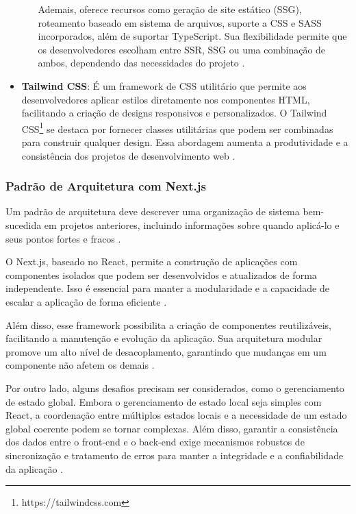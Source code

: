 \begin{itemize}
\begin{itemize}
        Ademais, oferece recursos como geração de site estático (SSG), roteamento baseado em sistema de arquivos, suporte a CSS e SASS incorporados, além de suportar TypeScript. Sua flexibilidade permite que os desenvolvedores escolham entre SSR, SSG ou uma combinação de ambos, dependendo das necessidades do projeto \cite{RenanNextjs2024}.
    \end{itemize}
    \item \textbf{Tailwind CSS}: É um framework de CSS utilitário que permite aos desenvolvedores aplicar estilos diretamente nos componentes HTML, facilitando a criação de designs responsivos e personalizados. O Tailwind CSS\footnote{https://tailwindcss.com} se destaca por fornecer classes utilitárias que podem ser combinadas para construir qualquer design. Essa abordagem aumenta a produtividade e a consistência dos projetos de desenvolvimento web \cite{bosco2024crefide}.
\end{itemize}

\subsubsection{Padrão de Arquitetura com Next.js}

Um padrão de arquitetura deve descrever uma organização de sistema bem-sucedida em projetos anteriores, incluindo informações sobre quando aplicá-lo e seus pontos fortes e fracos \cite{sommerville2011engenharia}.

O Next.js, baseado no React, permite a construção de aplicações com componentes isolados que podem ser desenvolvidos e atualizados de forma independente. Isso é essencial para manter a modularidade e a capacidade de escalar a aplicação de forma eficiente \cite{gouveaimplementaccao}.

Além disso, esse framework possibilita a criação de componentes reutilizáveis, facilitando a manutenção e evolução da aplicação. Sua arquitetura modular promove um alto nível de desacoplamento, garantindo que mudanças em um componente não afetem os demais \cite{gouveaimplementaccao}.

Por outro lado, alguns desafios precisam ser considerados, como o gerenciamento de estado global. Embora o gerenciamento de estado local seja simples com React, a coordenação entre múltiplos estados locais e a necessidade de um estado global coerente podem se tornar complexas. Além disso, garantir a consistência dos dados entre o front-end e o back-end exige mecanismos robustos de sincronização e tratamento de erros para manter a integridade e a confiabilidade da aplicação \cite{gouveaimplementaccao}.

